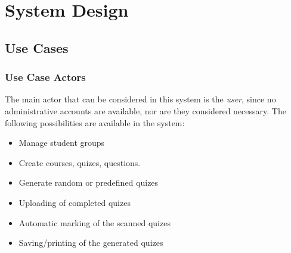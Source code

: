 \section{System Design}


\subsection{Use Cases}

\subsubsection{Use Case Actors}
The main actor that can be considered in this system is the \textit{user}, since no administrative accounts are available, nor are they considered necessary. The following possibilities are available in the system:
\begin{itemize}
  \item Manage student groups 
  \item Create courses, quizes, questions.
  \item Generate random or predefined quizes
  \item Uploading of completed quizes
  \item Automatic marking of the scanned quizes
  \item Saving/printing of the generated quizes
\end{itemize}

